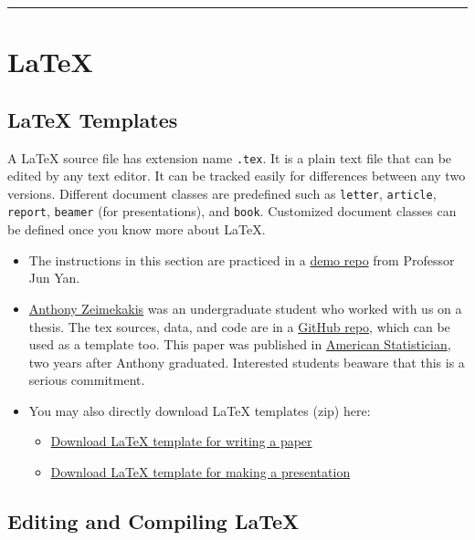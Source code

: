 \documentclass[
]{book}
\providecommand{\tightlist}{%
  \setlength{\itemsep}{0pt}\setlength{\parskip}{0pt}}
\theoremstyle{definition}
\theoremstyle{definition}
\theoremstyle{definition}
\theoremstyle{definition}
\theoremstyle{remark}
\begin{document}
\begin{center}\rule{0.5\linewidth}{0.5pt}\end{center}

\section{LaTeX}\label{latex}

\subsection{LaTeX Templates}\label{latex-templates}

A LaTeX source file has extension name \texttt{.tex}. It is a plain text file that can
be edited by any text editor. It can be tracked easily for differences between
any two versions. Different document classes are predefined such as \texttt{letter},
\texttt{article}, \texttt{report}, \texttt{beamer} (for presentations), and \texttt{book}. Customized
document classes can be defined once
you know more about LaTeX.

\begin{itemize}
\item
  The instructions in this section are practiced in a \href{https://github.com/jun-yan/writing-demo}{demo repo} from Professor Jun Yan.
\item
  \href{https://www.linkedin.com/in/anthony-zeimbekakis/}{Anthony Zeimekakis}
  was an undergraduate student who worked with us on a thesis. The
  tex sources, data, and code are in a \href{https://github.com/azeimbekakis/KS-Test-Thesis}{GitHub
  repo}, which can be
  used as a template too. This paper was published in \href{https://doi.org/10.1080/00031305.2024.2356095}{American
  Statistician}, two
  years after Anthony graduated. Interested students beaware that this
  is a serious commitment.
\item
  You may also directly download LaTeX templates (zip) here:

  \begin{itemize}
  \tightlist
  \item
    \href{files/Paper_templete.zip}{Download LaTeX template for writing a paper}
  \item
    \href{files/Presentation_templete.zip}{Download LaTeX template for making a presentation}
  \end{itemize}
\end{itemize}

\subsection{Editing and Compiling LaTeX}\label{editing-and-compiling-latex}
\end{document}
